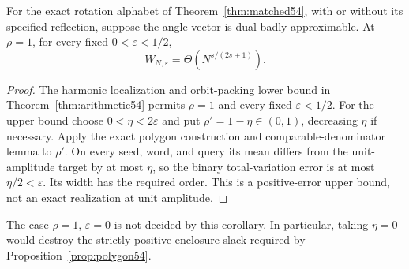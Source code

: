 \begin{corollary}\label{cor:unitnoise55}
For the exact rotation alphabet of Theorem~\ref{thm:matched54}, with or without its specified reflection, suppose the angle vector is dual badly approximable. At $\rho=1$, for every fixed $0<\varepsilon<1/2$,
\[
                     W_{N,\varepsilon}=\Theta(N^{s/(2s+1)}).
\]
\end{corollary}
\begin{proof}
The harmonic localization and orbit-packing lower bound in Theorem~\ref{thm:arithmetic54} permits $\rho=1$ and every fixed $\varepsilon<1/2$. For the upper bound choose $0<\eta<2\varepsilon$ and put $\rho'=1-\eta\in(0,1)$, decreasing $\eta$ if necessary. Apply the exact polygon construction and comparable-denominator lemma to $\rho'$. On every seed, word, and query its mean differs from the unit-amplitude target by at most $\eta$, so the binary total-variation error is at most $\eta/2<\varepsilon$. Its width has the required order. This is a positive-error upper bound, not an exact realization at unit amplitude.
\end{proof}
The case $\rho=1$, $\varepsilon=0$ is not decided by this corollary. In particular, taking $\eta=0$ would destroy the strictly positive enclosure slack required by Proposition~\ref{prop:polygon54}.
